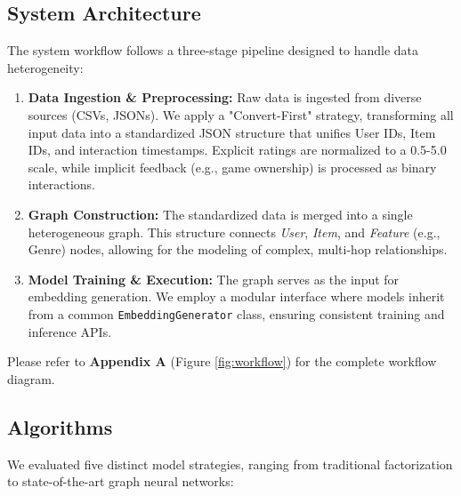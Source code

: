 \documentclass{article}
\begin{document}
\subsection{System Architecture}
The system workflow follows a three-stage pipeline designed to handle data heterogeneity:
\begin{enumerate}
    \item \textbf{Data Ingestion \& Preprocessing:} Raw data is ingested from diverse sources (CSVs, JSONs). We apply a "Convert-First" strategy, transforming all input data into a standardized JSON structure that unifies User IDs, Item IDs, and interaction timestamps. Explicit ratings are normalized to a 0.5-5.0 scale, while implicit feedback (e.g., game ownership) is processed as binary interactions.
    \item \textbf{Graph Construction:} The standardized data is merged into a single heterogeneous graph. This structure connects \textit{User}, \textit{Item}, and \textit{Feature} (e.g., Genre) nodes, allowing for the modeling of complex, multi-hop relationships.
    \item \textbf{Model Training \& Execution:} The graph serves as the input for embedding generation. We employ a modular interface where models inherit from a common \texttt{EmbeddingGenerator} class, ensuring consistent training and inference APIs.
\end{enumerate}

Please refer to \textbf{Appendix A} (Figure \ref{fig:workflow}) for the complete workflow diagram.

\subsection{Algorithms}
We evaluated five distinct model strategies, ranging from traditional factorization to state-of-the-art graph neural networks:
\end{document}
